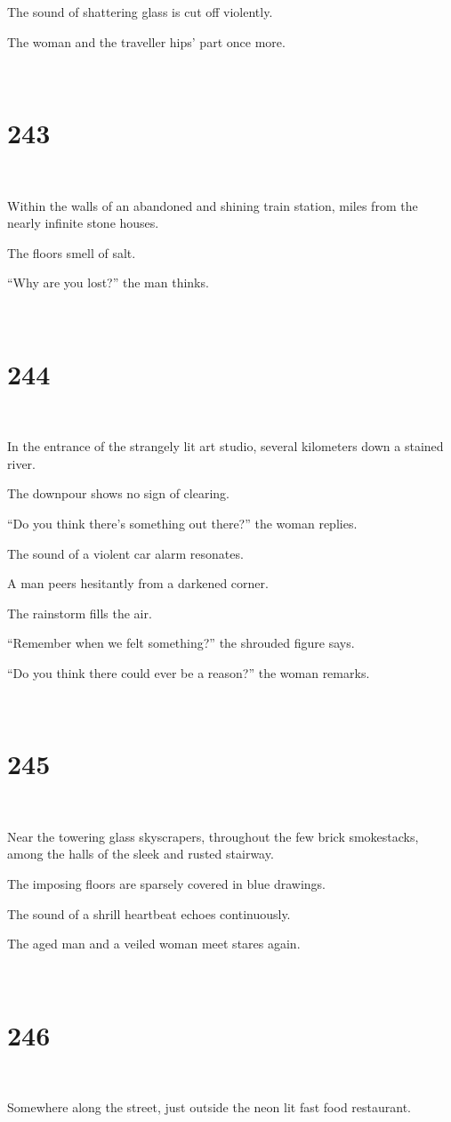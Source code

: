 \documentclass{report}
\begin{document}
The sound of shattering glass is cut off violently.

The woman and the traveller hips' part once more.

~
\chapter*{243}
~

Within the walls of an abandoned and shining train station, miles from the nearly infinite stone houses.

The floors smell of salt.

``Why are you lost?'' the man thinks.

~
\chapter*{244}
~

In the entrance of the strangely lit art studio, several kilometers down a stained river.

The downpour shows no sign of clearing.

``Do you think there's something out there?'' the woman replies.

The sound of a violent car alarm resonates.

A man peers hesitantly from a darkened corner.

The rainstorm fills the air.

``Remember when we felt something?'' the shrouded figure says.

``Do you think there could ever be a reason?'' the woman remarks.

~
\chapter*{245}
~

Near the towering glass skyscrapers, throughout the few brick smokestacks, among the halls of the sleek and rusted stairway.

The imposing floors are sparsely covered in blue drawings.

The sound of a shrill heartbeat echoes continuously.

The aged man and a veiled woman meet stares again.

~
\chapter*{246}
~

Somewhere along the street, just outside the neon lit fast food restaurant.
\end{document}
